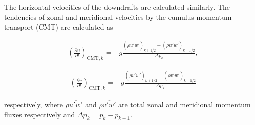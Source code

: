 The horizontal velocities of the downdrafts are calculated similarly.
The tendencies of zonal and meridional velocities by the cumulus
momentum transport (CMT) are calculated as

\begin{eqnarray}
 \left(\frac{\partial u}{\partial t}\right)_{\mathrm{CMT},k} = -g\frac{(\rho\overline{u'w'})_{k+1/2} - (\rho\overline{u'w'})_{k-1/2}}{\Delta p_k},
\end{eqnarray}

\begin{eqnarray}
 \left(\frac{\partial v}{\partial t}\right)_{\mathrm{CMT},k} = -g\frac{(\rho\overline{v'w'})_{k+1/2} - (\rho\overline{v'w'})_{k-1/2}}{\Delta p_k}
\end{eqnarray}

respectively, where \(\rho\overline{u'w'}\) and \(\rho\overline{v'w'}\)
are total zonal and meridional momentum fluxes respectively and
\(\Delta p_k = p_k - p_{k+1}\).
